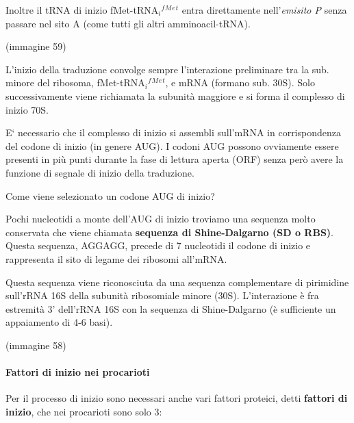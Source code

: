 \documentclass[11pt]{book}
\begin{document}
Inoltre il tRNA di inizio fMet-tRNA\(_i\)\(^f\)\(^M\)\(^e\)\(^t\) entra
direttamente nell'\emph{emisito P} senza passare nel sito A (come tutti
gli altri amminoacil-tRNA).

(immagine 59)

L'inizio della traduzione convolge sempre l'interazione preliminare tra
la sub. minore del ribosoma, fMet-tRNA\(_i\)\(^f\)\(^M\)\(^e\)\(^t\), e
mRNA (formano sub. 30S). Solo successivamente viene richiamata la
subunità maggiore e si forma il complesso di inizio 70S.

E` necessario che il complesso di inizio si assembli sull'mRNA in
corrispondenza del codone di inizio (in genere AUG). I codoni AUG
possono ovviamente essere presenti in più punti durante la fase di
lettura aperta (ORF) senza però avere la funzione di segnale di inizio
della traduzione.

Come viene selezionato un codone AUG di inizio?

Pochi nucleotidi a monte dell'AUG di inizio troviamo una sequenza molto
conservata che viene chiamata \textbf{sequenza di Shine-Dalgarno (SD o
RBS)}. Questa sequenza, AGGAGG, precede di 7 nucleotidi il codone di
inizio e rappresenta il sito di legame dei ribosomi all'mRNA.

Questa sequenza viene riconosciuta da una sequenza complementare di
pirimidine sull'rRNA 16S della subunità ribosomiale minore (30S).
L'interazione è fra estremità 3' dell'rRNA 16S con la sequenza di
Shine-Dalgarno (è sufficiente un appaiamento di 4-6 basi).

(immagine 58)

\paragraph{Fattori di inizio nei
procarioti}\label{fattori-di-inizio-nei-procarioti}

Per il processo di inizio sono necessari anche vari fattori proteici,
detti \textbf{fattori di inizio}, che nei procarioti sono solo 3:
\end{document}
